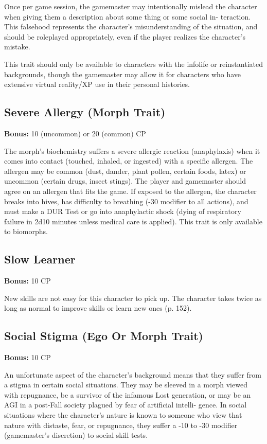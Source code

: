 Once per game session, the gamemaster may intentionally mislead the character when giving them a description about some thing or some social in- teraction. This falsehood represents the character’s misunderstanding of the situation, and should be roleplayed appropriately, even if the player realizes the character’s mistake.

This trait should only be available to characters with the infolife or reinstantiated backgrounds, though the gamemaster may allow it for characters who have extensive virtual reality/XP use in their personal histories.

\subsection{Severe Allergy (Morph Trait)}
\label{sec:traits-severe-allergy}

\textbf{Bonus:} 10 (uncommon) or 20 (common) CP

The morph’s biochemistry suffers a severe allergic reaction (anaphylaxis) when it comes into contact (touched, inhaled, or ingested) with a specific allergen. The allergen may be common (dust, dander, plant pollen, certain foods, latex) or uncommon (certain drugs, insect stings). The player and gamemaster should agree on an allergen that fits the game. If exposed to the allergen, the character breaks into hives, has difficulty to breathing (-30 modifier to all actions), and must make a DUR Test or go into anaphylactic shock (dying of respiratory failure in 2d10 minutes unless medical care is applied). This trait is only available to biomorphs.

\subsection{Slow Learner}
\label{sec:traits-slow-learner}

\textbf{Bonus:} 10 CP

New skills are not easy for this character to pick up. The character takes twice as long as normal to improve skills or learn new ones (p. 152).

\subsection{Social Stigma (Ego Or Morph Trait)}
\label{sec:traits-social-stigma}

\textbf{Bonus:} 10 CP

An unfortunate aspect of the character’s background means that they suffer from a stigma in certain social situations. They may be sleeved in a morph viewed with repugnance, be a survivor of the infamous Lost generation, or may be an AGI in a post-Fall society plagued by fear of artificial intelli- gence. In social situations where the character’s nature is known to someone who view that nature with distaste, fear, or repugnance, they suffer a -10 to -30 modifier (gamemaster’s discretion) to social skill tests.

